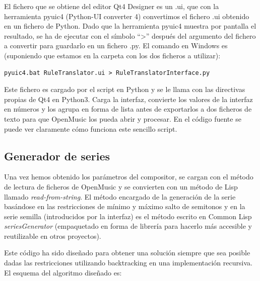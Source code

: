 \documentclass[a4paper,openany,oneside,12pt]{book}
\begin{document}
El fichero que se obtiene del editor Qt4 Designer es un .ui, que con la herramienta pyuic4 (Python-UI converter 4) convertimos el fichero .ui obtenido en un fichero de Python. Dado que la herramienta pyuic4 muestra por pantalla el resultado, se ha de ejecutar con el símbolo ``>'' después del argumento del fichero a convertir para guardarlo en un fichero .py. El comando en Windows es (suponiendo que estamos en la carpeta con los dos ficheros a utilizar):

   \lstset{language=Bash,
           basicstyle=\ttfamily\scriptsize,
           keywordstyle=\ttfamily,
           stringstyle=\ttfamily,
           commentstyle=\ttfamily,
          breaklines=true
          }
\begin{lstlisting}
pyuic4.bat RuleTranslator.ui > RuleTranslatorInterface.py
\end{lstlisting}

Este fichero es cargado por el script en Python y se le llama con las directivas propias de Qt4 en Python3. Carga la interfaz, convierte los valores de la interfaz en números y los agrupa en forma de lista antes de exportarlos a dos ficheros de texto para que OpenMusic los pueda abrir y procesar. En el código fuente se puede ver claramente cómo funciona este sencillo script.

\subsection{Generador de series}
Una vez hemos obtenido los parámetros del compositor, se cargan con el método de lectura de ficheros de OpenMusic y se convierten con un método de Lisp llamado \emph{read-from-string}. El método encargado de la generación de la serie basándose en las restricciones de mínimo y máximo salto de semitonos y en la serie semilla (introducidos por la interfaz) es el método escrito en Common Lisp \emph{seriesGenerator} (empaquetado en forma de librería para hacerlo más accesible y reutilizable en otros proyectos).

Este código ha sido diseñado para obtener una solución siempre que sea posible dadas las restricciones utilizando backtracking en una implementación recursiva. El esquema del algoritmo diseñado es:
\end{document}
